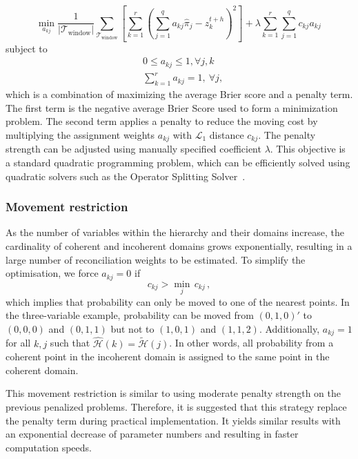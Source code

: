 \documentclass[a4paper,review,12pt,authoryear]{elsarticle}
\begin{document}
    \[
    \underset{a_{kj}}{\min} \frac{1}{|\mathcal{T}_{\textrm{window}}|}\sum\limits_{\mathcal{T}_{\textrm{window}}}\left[\sum\limits_{k=1}^r\left(\sum\limits_{j=1}^q a_{kj}\hat{{\pi}}_j-z^{t+h}_k\right)^2\right] + \lambda\sum\limits_{k=1}^r\sum\limits_{j=1}^q c_{kj}a_{kj}\,
    \]
    subject to
    \begin{align*}
    &0\leq a_{kj}\leq 1,\forall j, k\\
    &\sum\limits_{k=1}^r a_{kj} = 1,~\forall j,
    \end{align*}
    which is a combination of maximizing the average Brier score and a penalty term.
    The first term is the negative average Brier Score used to form a minimization problem. The second term applies a penalty to reduce the moving cost by multiplying the assignment weights $a_{kj}$ with $\mathcal{L}_1$ distance $c_{kj}$.
    The penalty strength can be adjusted using manually specified coefficient $\lambda$.
    This objective is a standard quadratic programming problem, which can be efficiently solved using quadratic solvers such as the Operator Splitting Solver~\citep[OSQP,][]{stellatoOSQPOperatorSplitting2020}.

    \subsubsection*{\textbf{Movement restriction}}
    As the number of variables within the hierarchy and their domains increase, the cardinality of coherent and incoherent domains grows exponentially, resulting in a large number of reconciliation weights to be estimated.
    To simplify the optimisation, we force $a_{kj}=0$ if
    \[
      c_{kj}>\underset{j}{\min}\,c_{kj}\,,
    \]
    which implies that probability can only be moved to one of the nearest points. In the three-variable example, probability can be moved from $(0,1,0)'$ to $(0,0,0)$ and $(0,1,1)$ but not to $(1,0,1)$ and $(1,1,2)$.
    Additionally, $a_{kj}=1$ for all $k,j$ such that $\hat{\mathcal{H}}(k)=\tilde{\mathcal{H}}(j)$.
    In other words, all probability from a coherent point in the incoherent domain is assigned to the same point in the coherent domain.

    This movement restriction is similar to using moderate penalty strength on the previous penalized problems.
    Therefore, it is suggested that this strategy replace the penalty term during practical implementation. It yields similar results with an exponential decrease of parameter numbers and resulting in faster computation speeds.
\end{document}
